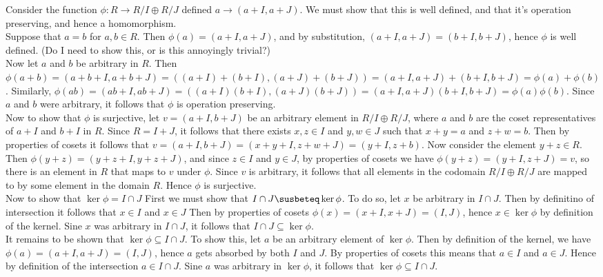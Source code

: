 \documentclass{article}
\begin{document}
 Consider the function $\phi:R\rightarrow R/I \oplus R/J$ defined $a \rightarrow (a + I, a+ J)$. We must show that this is well defined, and that it's operation preserving, and hence a homomorphism. \\

Suppose that $a = b$ for $a,b\in R$. Then $\phi(a) = (a + I, a + J)$, and by substitution, $(a + I, a + J) = (b + I, b + J)$, hence $\phi$ is well defined. (Do I need to show this, or is this annoyingly trivial?)\\

Now let $a$ and $b$ be arbitrary in $R$. Then $\phi(a + b) = (a + b + I, a + b + J) = ((a + I) + (b + I), (a + J) + (b+ J)) = (a + I, a + J) + (b + I, b + J) = \phi(a) + \phi(b)$. Similarly, 
$\phi(ab) = (ab + I, ab + J) = ((a + I)(b + I), (a + J)(b+ J)) = (a + I, a + J)(b + I, b + J) = \phi(a)\phi(b)$. Since $a$ and $b$ were arbitrary, it follows that $\phi$ is operation preserving.\\

Now to show that $\phi$ is surjective, let $v = (a + I, b + J)$ be an arbitrary element in $R/I \oplus R/J$, where $a$ and $b$ are the coset representatives of $a + I$ and $b + I$ in $R$. Since $R = I + J$, it follows that there exists $x,z\in I$ and $y,w\in J$ such that $x + y = a$ and $z + w = b$. Then by properties of cosets it follows that $v = (a + I,b + J) =(x + y + I,z + w + J)= (y + I, z + b)$. Now consider the element $y + z\in R$. Then $\phi(y + z) = (y + z + I, y + z + J)$, and since $z\in I$ and $y \in J$, by properties of cosets we have $\phi(y + z) = (y + I, z + J) = v$, so there is an element in $R$ that maps to $v$ under $\phi$. Since $v$ is arbitrary, it follows that all elements in the codomain $R/I\oplus R/J$ are mapped to by some element in the domain $R$. Hence $\phi$ is surjective.\\

Now to show that $\ker\phi = I\cap J$ First we must show that $I\cap J \susbeteq \ker\phi$. To do so, let $x$ be arbitrary in $I\cap J$. Then by definitino of intersection it follows that $x\in I$ and $x\in J$ Then by properties of cosets $\phi(x) = (x + I, x + J) = (I, J)$, hence $x\in \ker\phi$ by definition of the kernel. Sine $x$ was arbitrary in $I\cap J$, it follows that $I\cap J\subseteq \ker\phi$.\\

It remains to be shown that $\ker\phi\subseteq I\cap J$. To show this, let $a$ be an arbitrary element of $\ker\phi$. Then by definition of the kernel, we have $\phi(a) = (a + I, a + J) = (I, J)$, hence $a$ gets absorbed by both $I$ and $J$. By properties of cosets this means that $a\in I$ and $ a\in J$. Hence by definition of the intersection $a\in I\cap J$. Sine $a$ was arbitrary in $\ker\phi$, it follows that $\ker\phi \subseteq I\cap J$.\\
\end{document}
